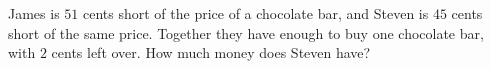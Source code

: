 James is $51$ cents short of the price of a chocolate bar, and Steven is $45$ cents short of the same price. Together they have enough to buy one chocolate bar, with $2$ cents left over. How much money does Steven have?
